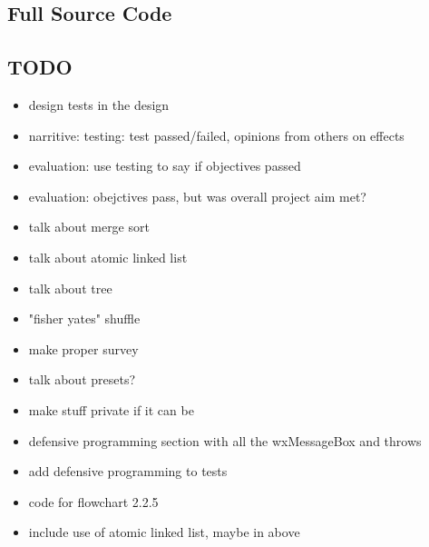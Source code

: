\documentclass{article}
\begin{document}
	\subsection{Full Source Code}
	
	
	\subsection{TODO}
	\begin{itemize}
		\item design tests in the design
		\item narritive: testing: test passed/failed, opinions from others on effects
		\item evaluation: use testing to say if objectives passed
		\item evaluation: obejctives pass, but was overall project aim met?
		\item talk about merge sort
		\item talk about atomic linked list
		\item talk about tree
		\item "fisher yates" shuffle
		\item make proper survey
		\item talk about presets?
		\item make stuff private if it can be
		\item defensive programming section with all the wxMessageBox and throws
		\item add defensive programming to tests
		\item code for flowchart 2.2.5
		\item include use of atomic linked list, maybe in above
	\end{itemize}
	
\end{document}
